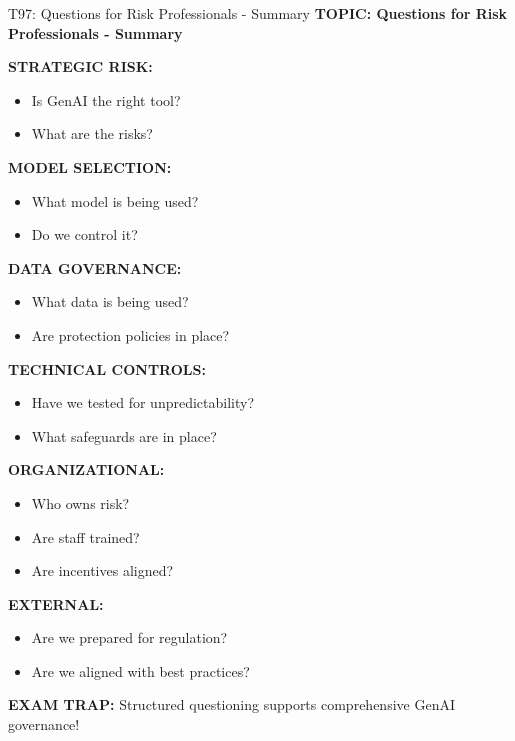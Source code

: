 \documentclass[8pt]{beamer}
\begin{document}
	\begin{frame}{T97: Questions for Risk Professionals - Summary}
		\fontsize{6.5}{7.5}\selectfont
		\textbf{TOPIC: Questions for Risk Professionals - Summary}
		
		\vspace{0.1cm}
		\textbf{STRATEGIC RISK:}
		\begin{itemize}
			\item Is GenAI the right tool?
			\item What are the risks?
		\end{itemize}
		
		\vspace{0.1cm}
		\textbf{MODEL SELECTION:}
		\begin{itemize}
			\item What model is being used?
			\item Do we control it?
		\end{itemize}
		
		\vspace{0.1cm}
		\textbf{DATA GOVERNANCE:}
		\begin{itemize}
			\item What data is being used?
			\item Are protection policies in place?
		\end{itemize}
		
		\vspace{0.1cm}
		\textbf{TECHNICAL CONTROLS:}
		\begin{itemize}
			\item Have we tested for unpredictability?
			\item What safeguards are in place?
		\end{itemize}
		
		\vspace{0.1cm}
		\textbf{ORGANIZATIONAL:}
		\begin{itemize}
			\item Who owns risk?
			\item Are staff trained?
			\item Are incentives aligned?
		\end{itemize}
		
		\vspace{0.1cm}
		\textbf{EXTERNAL:}
		\begin{itemize}
			\item Are we prepared for regulation?
			\item Are we aligned with best practices?
		\end{itemize}
		
		\textcolor{myred}{\textbf{EXAM TRAP:}} Structured questioning \textcolor{myblue}{supports comprehensive GenAI governance}!
	\end{frame}
	
\end{document}
